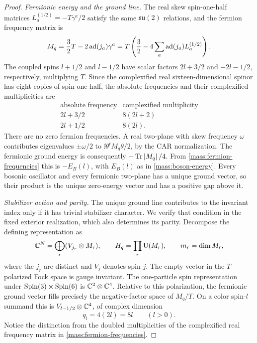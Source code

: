 \begin{proof}
\smallskip\noindent\emph{Fermionic energy and the ground line.}
The real skew spin-one-half matrices
\(L_a^{(1/2)}=-T\gamma^a/2\) satisfy the same
\(\mathfrak{su}(2)\) relations, and the fermion frequency matrix is
\[
 M_q=\frac32T-2\operatorname{ad}(j_a)\gamma^a
   =T\left(\frac32-4\sum_a\operatorname{ad}(j_a)L_a^{(1/2)}\right).
\]
The coupled spins \(l+1/2\) and \(l-1/2\) have scalar factors
\(2l+3/2\) and \(-2l-1/2\), respectively, multiplying \(T\).
Since the complexified real sixteen-dimensional spinor has eight
copies of spin one-half, the absolute frequencies and their
complexified multiplicities are
\begin{equation}
\label{mass:fermion-frequencies}
 \begin{array}{c|c}
 \text{absolute frequency}&\text{complexified multiplicity}\\ \hline
 2l+3/2&8(2l+2)\\
 2l+1/2&8(2l).
 \end{array}
\end{equation}
There are no zero fermion frequencies. A real two-plane with skew
frequency \(\omega\) contributes eigenvalues \(\pm\omega/2\) to
\(\ii\theta^tM_q\theta/2\), by the CAR normalization. The fermionic
ground energy is consequently \(-\operatorname{Tr}\left\lvert M_q\right\rvert/4\). From
\eqref{mass:fermion-frequencies} this is \(-E_B(l)\), with
\(E_B(l)\) as in \eqref{mass:boson-energy}. Every bosonic oscillator
and every fermionic two-plane has a unique ground vector, so their
product is the unique zero-energy vector and has a positive gap
above it.

\smallskip\noindent\emph{Stabilizer action and parity.}
The unique ground line contributes to the invariant index only if it
has trivial stabilizer character. We verify that condition in the
fixed exterior realization, which also determines its parity.
Decompose the defining representation as
\[
 \mathbb C^N=\bigoplus_r(V_{j_r}\otimes M_r),\qquad
 H_q=\prod_r\operatorname{U}(M_r),\qquad m_r=\dim M_r,
\]
where the \(j_r\) are distinct and \(V_j\) denotes spin \(j\).
The empty vector in the \(T\)-polarized Fock space is gauge
invariant. The one-particle spin representation under
\(\operatorname{Spin}(3)\times\operatorname{Spin}(6)\) is \(\mathbb C^2\otimes\mathbb C^4\). Relative to
this polarization, the fermionic ground vector fills precisely the
negative-factor space of \(M_q/T\). On a color spin-\(l\) summand
this is \(V_{l-1/2}\otimes\mathbb C^4\), of complex dimension
\begin{equation}
\label{mass:occupied-dimension}
 q_l=4(2l)=8l\qquad(l>0).
\end{equation}
Notice the distinction from the doubled multiplicities of the
complexified real frequency matrix in
\eqref{mass:fermion-frequencies}.


\end{proof}
